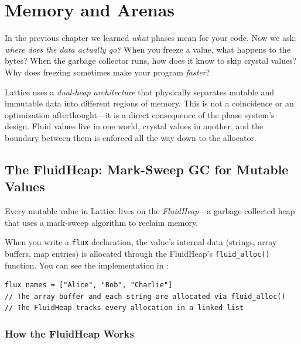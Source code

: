 \chapter{Memory and Arenas}\label{ch:memory-arenas}


In the previous chapter we learned \emph{what} phases mean for your code.
Now we ask: \emph{where does the data actually go?}
When you freeze a value, what happens to the bytes?
When the garbage collector runs, how does it know to skip crystal values?
Why does freezing sometimes make your program \emph{faster}?

Lattice uses a \emph{dual-heap architecture} that physically separates mutable and immutable data into different regions of memory.
This is not a coincidence or an optimization afterthought---it is a direct consequence of the phase system's design.
Fluid values live in one world, crystal values in another, and the boundary between them is enforced all the way down to the allocator.

\section{The FluidHeap: Mark-Sweep GC for Mutable Values}\label{sec:fluid-heap}


Every mutable value in Lattice lives on the \emph{FluidHeap}---a garbage-collected heap that uses a mark-sweep algorithm to reclaim memory.

When you write a \lstinline|flux| declaration, the value's internal data (strings, array buffers, map entries) is allocated through the FluidHeap's \lstinline|fluid_alloc()| function.
You can see the implementation in :

\begin{lstlisting}[language=Lattice, caption={Fluid values live on the GC-managed heap}]
flux names = ["Alice", "Bob", "Charlie"]
// The array buffer and each string are allocated via fluid_alloc()
// The FluidHeap tracks every allocation in a linked list
\end{lstlisting}

\subsection{How the FluidHeap Works}


